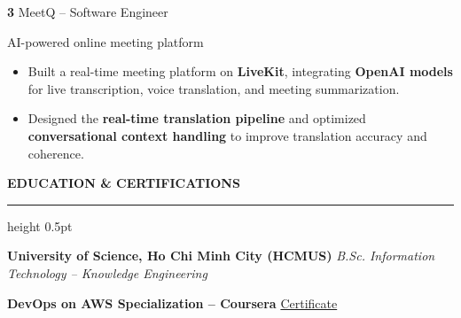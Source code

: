 \documentclass[a4paper,10pt]{article}
\newcommand{\cvsection}[1]{%
    \par
    \vspace{4pt}%
    \noindent
    {\normalsize\textbf{#1}}%
    \par
    \vspace{1pt}%
    \hrule height 0.5pt
    \vspace{2.5pt}%
}
\newcommand{\project}[2]{%
    \noindent
    \textbf{#1}
    \hspace{3pt}\textbar\hspace{3pt}
    #2
    \par
}
\newcommand{\jobspace}{%
    \vspace{2pt}
}
\begin{document}
\jobspace


\project
3{MeetQ -- Software Engineer}
{AI-powered online meeting platform}

\begin{itemize}

    \item Built a real-time meeting platform on
    \textbf{LiveKit}, integrating
    \textbf{OpenAI models} for live transcription,
    voice translation, and meeting summarization.

    \item Designed the
    \textbf{real-time translation pipeline}
    and optimized \textbf{conversational context handling}
    to improve translation accuracy and coherence.

\end{itemize}




\cvsection{EDUCATION \& CERTIFICATIONS}

\noindent
\textbf{University of Science, Ho Chi Minh City (HCMUS)}
\hfill
\textit{B.Sc. Information Technology -- Knowledge Engineering}

\vspace{1.5pt}

\noindent
\textbf{DevOps on AWS Specialization -- Coursera}
\hfill
\href{
https://www.coursera.org/account/accomplishments/specialization/UDQ2L4ER9CYC
}{
Certificate
}
\end{document}
